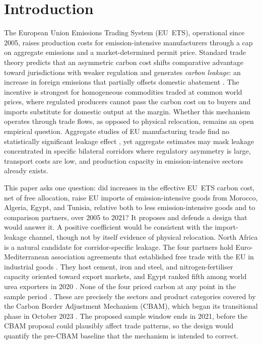 \section{Introduction}
\label{sec:introduction}

The European Union Emissions Trading System (EU~ETS), operational since 2005, raises production costs for emission-intensive manufacturers through a cap on aggregate emissions and a market-determined permit price. Standard trade theory predicts that an asymmetric carbon cost shifts comparative advantage toward jurisdictions with weaker regulation and generates \emph{carbon leakage}: an increase in foreign emissions that partially offsets domestic abatement \citep{fowlie2016}. The incentive is strongest for homogeneous commodities traded at common world prices, where regulated producers cannot pass the carbon cost on to buyers and imports substitute for domestic output at the margin. Whether this mechanism operates through trade flows, as opposed to physical relocation, remains an open empirical question. Aggregate studies of EU manufacturing trade find no statistically significant leakage effect \citep{naegele2019}, yet aggregate estimates may mask leakage concentrated in specific bilateral corridors where regulatory asymmetry is large, transport costs are low, and production capacity in emission-intensive sectors already exists.

This paper asks one question: did increases in the effective EU~ETS carbon cost, net of free allocation, raise EU imports of emission-intensive goods from Morocco, Algeria, Egypt, and Tunisia, relative both to less emission-intensive goods and to comparison partners, over 2005 to 2021? It proposes and defends a design that would answer it. A positive coefficient would be consistent with the import-leakage channel, though not by itself evidence of physical relocation. North Africa is a natural candidate for corridor-specific leakage. The four partners hold Euro-Mediterranean association agreements that established free trade with the EU in industrial goods \citep{eumed}. They host cement, iron and steel, and nitrogen-fertiliser capacity oriented toward export markets, and Egypt ranked fifth among world urea exporters in 2020 \citep{usgs2021}. None of the four priced carbon at any point in the sample period \citep{worldbank2026}. These are precisely the sectors and product categories covered by the Carbon Border Adjustment Mechanism (CBAM), which began its transitional phase in October 2023 \citep{cbam2023}. The proposed sample window ends in 2021, before the CBAM proposal could plausibly affect trade patterns, so the design would quantify the pre-CBAM baseline that the mechanism is intended to correct.


